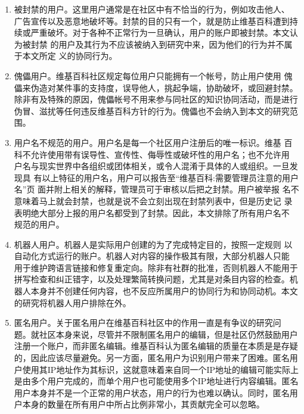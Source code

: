 \begin{enumerate}
\item 被封禁的用户。这里用户通常是在社区中有不恰当的行为，例如攻击他人、
  广告宣传以及恶意地破坏等。封禁的目的只有一个，就是防止维基百科遭到持
  续或严重破坏。对于各种不正常行为一旦确认，用户的账户即被封禁。本文认为被封禁
  的用户及其行为不应该被纳入到研究中来，因为他们的行为并不属于本文所定
  义的协同行为。%
\item 傀儡用户。维基百科社区规定每位用户只能拥有一个帐号，防止用户使用
  傀儡来伪造对某件事的支持度，误导他人，挑起争端，协助破坏，或回避封禁。
  除非有及特殊的原因，傀儡帐号不用来参与同社区的知识协同活动，而是进行
  伪冒、滋扰等任何违反维基百科方针的行为。傀儡也不会纳入到本文的研究范
  围。
\item 用户名不规范的用户。用户名是每一个社区用户注册后的唯一标识。维基
  百科不允许使用带有误导性、宣传性、侮辱性或破坏性的用户名；也不允许用
  户名与现实世界中各组织或团体相关，或令人混淆于具体的人或组织。一旦发现具
  有以上特征的用户名，用户可以报告至“维基百科:需要管理员注意的用户名”页
  面并附上相关的解释，管理员可于审核以后把之封禁。用户被举报
  名不意味着马上就会封禁，也就是说不会立刻出现在封禁列表中，但是历史记
  录表明绝大部分上报的用户名都受到了封禁。因此，本文排除了所有用户名不
  规范的用户。
\item 机器人用户。机器人是实际用户创建的为了完成特定目的，按照一定规则
  以自动化方式运行的账户。机器人对内容的操作极其有限，大部分机器人只能
  用于维护跨语言链接和修复重定向。除非有社群的批准，否则机器人不能用于
  拼写检查和纠正错字，以及处理繁简转换问题，尤其是对条目内容的检查。机
  器人本身并不创建任何内容，也不反应所属用户的协同行为和协同动机。本文
  的研究将机器人用户排除在外。
\item 匿名用户。关于匿名用户在维基百科社区中的作用一直是有争议的研究问
  题。就社区本身来说，尽管并不限制匿名用户的编辑，但是社区仍然鼓励用户
  注册一个账户，而非匿名编辑。维基百科认为匿名编辑的质量在本质是是存疑
  的，因此应该尽量避免。另一方面，匿名用户为识别用户带来了困难。匿名用
  户使用其IP地址作为其标识，这就意味着来自同一个IP地址的编辑可能实际上
  是由多个用户完成的，而单个用户也可能使用多个IP地址进行内容编辑。匿名
  用户本身并不是一个正常的用户状态，用户的行为也难以确认。同时，匿名用
  户本身的数量在所有用户中所占比例非常小，其贡献完全可以忽略。

\end{enumerate}

